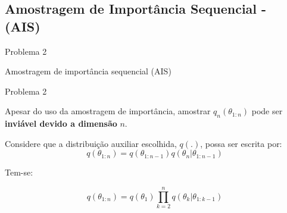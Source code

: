\documentclass{beamer}
\begin{document}
\subsection{Amostragem de Importância Sequencial - (AIS)}

\begin{frame}{Problema 2}
    \begin{block}{}
      \Huge  Amostragem de importância sequencial (AIS)
    \end{block}
\end{frame}




\begin{frame}{Problema 2}

Apesar do uso da amostragem de importância, amostrar $q_n(\theta_{1:n})$ pode ser \textbf{inviável devido a dimensão} $n$.

\vspace{0.5cm}

\pause

Considere que a distribuição auxiliar escolhida, $q(.)$, possa ser escrita por:
$$ q(\theta_{1:n})  = q(\theta_{1:n-1})q(\theta_n|\theta_{1:n-1})$$

\vspace{0.5cm}

\pause
Tem-se:

$$ q(\theta_{1:n})  = q(\theta_1)\prod_{k=2}^n q(\theta_k|\theta_{1:k-1})$$

\end{frame}
\end{document}
